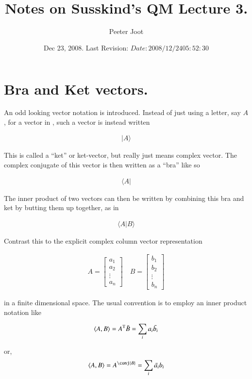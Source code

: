 \documentclass{article}
\title{ Notes on Susskind's QM Lecture 3. }
\author{Peeter Joot}
\date{ Dec 23, 2008.  Last Revision: $Date: 2008/12/24 05:52:30 $ }
\newcommand{\ket}[1]{\lvert {#1} \rangle}
\newcommand{\bra}[1]{\langle {#1} \rvert}
\newcommand{\braket}[2]{\langle{#1} \vert {#2}\rangle}
\begin{document}
\maketitle{}
\section{ Bra and Ket vectors. }

An odd looking vector notation is introduced.  Instead of just using a letter, say $A$, for a vector in , such a
vector is instead written

\begin{align*}
\ket{A}
\end{align*}

This is called a ``ket'' or ket-vector, but really just means complex vector.   The complex conjugate of this
vector is then written as a ``bra'' like so

\begin{align*}
\bra{A}
\end{align*}

The inner product of two vectors can then be written by combining this bra and ket by butting them up together, as
in

\begin{align*}
\braket{A}{B}
\end{align*}

Contrast this to the explicit complex column vector representation

\begin{align*}
{A} = 
\begin{bmatrix}
a_1 \\
a_2 \\
\vdots \\
a_n
\end{bmatrix}
\quad
{B} = 
\begin{bmatrix}
b_1 \\
b_2 \\
\vdots \\
b_n
\end{bmatrix}
\end{align*}

in a finite dimensional space.  The usual convention is to employ an inner product notation like

\begin{align*}
\langle{A}, {B}\rangle = {A}^\text{T} \bar{B} = \sum_i {a_i} \bar{b_i}
\end{align*}

or,
\begin{align*}
\innerprod{A}{B} = {A}^\conj {B} = \sum_i \bar{a_i} {b_i}
\end{align*}
\end{document}
